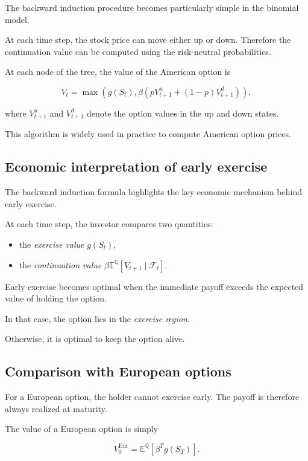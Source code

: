 \documentclass[11pt]{article}
\newcommand{\Qbb}{\mathbb{Q}}
\newcommand{\E}{\mathbb{E}}
\theoremstyle{definition}
\theoremstyle{plain}
\begin{document}
The backward induction procedure becomes particularly simple in the
binomial model.

At each time step, the stock price can move either up or down.
Therefore the continuation value can be computed using the
risk-neutral probabilities.

At each node of the tree, the value of the American option is

\[
V_t
=
\max
\left(
g(S_t),
\beta
\left(
p V_{t+1}^{u} + (1-p) V_{t+1}^{d}
\right)
\right),
\]

where \(V_{t+1}^{u}\) and \(V_{t+1}^{d}\) denote the option values in the
up and down states.

This algorithm is widely used in practice to compute American option
prices.

\subsection{Economic interpretation of early exercise}

The backward induction formula highlights the key economic mechanism
behind early exercise.

At each time step, the investor compares two quantities:

\begin{itemize}[leftmargin=1.4em]
\item the \emph{exercise value} \(g(S_t)\),
\item the \emph{continuation value}
\(\beta \E^{\Qbb}[V_{t+1} \mid \mathcal{F}_t]\).
\end{itemize}

Early exercise becomes optimal when the immediate payoff exceeds the
expected value of holding the option.

In that case, the option lies in the \emph{exercise region}.

Otherwise, it is optimal to keep the option alive.

\subsection{Comparison with European options}

For a European option, the holder cannot exercise early.
The payoff is therefore always realized at maturity.

The value of a European option is simply

\[
V_0^{\text{Eur}}
=
\E^{\Qbb}
\left[
\beta^T g(S_T)
\right].
\]
\end{document}
